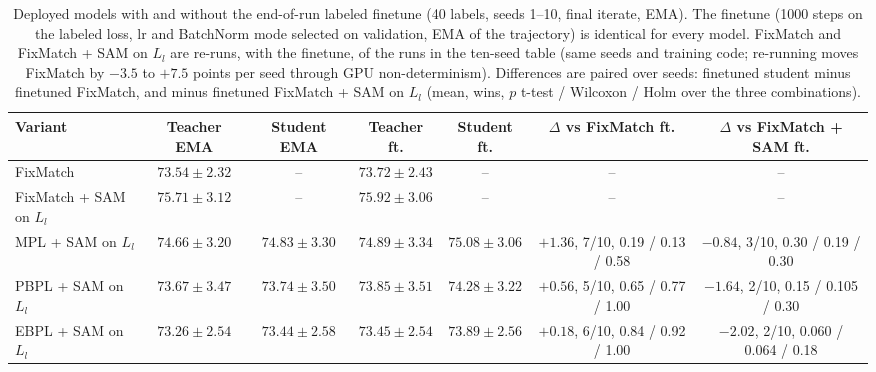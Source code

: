 \begin{table}[t]
\centering\small
\caption{Deployed models with and without the end-of-run labeled finetune (40 labels, seeds 1--10, final iterate, EMA). The finetune (1000 steps on the labeled loss, lr and BatchNorm mode selected on validation, EMA of the trajectory) is identical for every model. FixMatch and FixMatch + SAM on $L_l$ are re-runs, with the finetune, of the runs in the ten-seed table (same seeds and training code; re-running moves FixMatch by $-3.5$ to $+7.5$ points per seed through GPU non-determinism). Differences are paired over seeds: finetuned student minus finetuned FixMatch, and minus finetuned FixMatch + SAM on $L_l$ (mean, wins, $p$ t-test / Wilcoxon / Holm over the three combinations).}
\label{tab:finetune}
\begin{tabular}{lcccccc}
\toprule
Variant & Teacher EMA & Student EMA & Teacher ft. & Student ft. & $\Delta$ vs FixMatch ft. & $\Delta$ vs FixMatch + SAM ft. \\
\midrule
FixMatch & $73.54 \pm 2.32$ & -- & $73.72 \pm 2.43$ & -- & -- & -- \\
FixMatch + SAM on $L_l$ & $75.71 \pm 3.12$ & -- & $75.92 \pm 3.06$ & -- & -- & -- \\
MPL + SAM on $L_l$ & $74.66 \pm 3.20$ & $74.83 \pm 3.30$ & $74.89 \pm 3.34$ & $75.08 \pm 3.06$ & $+1.36$, 7/10, 0.19 / 0.13 / 0.58 & $-0.84$, 3/10, 0.30 / 0.19 / 0.30 \\
PBPL + SAM on $L_l$ & $73.67 \pm 3.47$ & $73.74 \pm 3.50$ & $73.85 \pm 3.51$ & $74.28 \pm 3.22$ & $+0.56$, 5/10, 0.65 / 0.77 / 1.00 & $-1.64$, 2/10, 0.15 / 0.105 / 0.30 \\
EBPL + SAM on $L_l$ & $73.26 \pm 2.54$ & $73.44 \pm 2.58$ & $73.45 \pm 2.54$ & $73.89 \pm 2.56$ & $+0.18$, 6/10, 0.84 / 0.92 / 1.00 & $-2.02$, 2/10, 0.060 / 0.064 / 0.18 \\
\bottomrule
\end{tabular}
\end{table}
